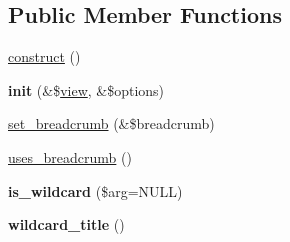 \subsection*{Public Member Functions}
\begin{CompactItemize}
\item 
\hyperlink{classviews__handler__argument_93594a31e95e1a14cead4f038d7b321b}{construct} ()
\item 
\hypertarget{classviews__handler__argument_2c7e59a9df090d59d9d7d2827b6da85a}{
\textbf{init} (\&\$\hyperlink{classview}{view}, \&\$options)}
\label{classviews__handler__argument_2c7e59a9df090d59d9d7d2827b6da85a}

\item 
\hyperlink{classviews__handler__argument_06263489052be463efd3c4afdf73851d}{set\_\-breadcrumb} (\&\$breadcrumb)
\item 
\hyperlink{classviews__handler__argument_a22155030bf440ff07a323569f80fd98}{uses\_\-breadcrumb} ()
\item 
\hypertarget{classviews__handler__argument_d002637c691f2cab7cd2ad0a6a8fc7ad}{
\textbf{is\_\-wildcard} (\$arg=NULL)}
\label{classviews__handler__argument_d002637c691f2cab7cd2ad0a6a8fc7ad}

\item 
\hypertarget{classviews__handler__argument_97596ab136b3eb4c0386f3060ce6d94b}{
\textbf{wildcard\_\-title} ()}
\label{classviews__handler__argument_97596ab136b3eb4c0386f3060ce6d94b}


\end{CompactItemize}

